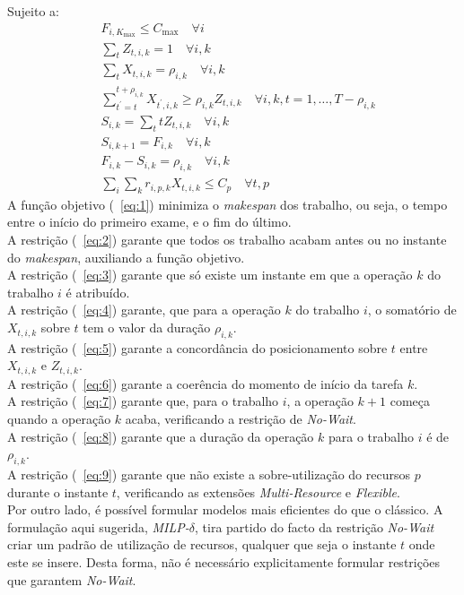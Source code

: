 Sujeito a:
\begin{align}
&F_{i,K_{\max}} \leq C_{\max} \quad \forall i \label{eq:2} \\
&\sum_{t}Z_{t,i,k} = 1 \quad \forall i,k \label{eq:3} \\
&\sum_{t}X_{t,i,k} = \rho_{i,k} \quad \forall i,k \label{eq:4} \\
&\sum^{t+\rho_{i,k}}_{t^{'}=t}X_{t^{'},i,k} \geq \rho_{i,k}Z_{t,i,k} \quad \forall i,k,t=1, \ldots,T-\rho_{i,k} \label{eq:5} \\
&S_{i,k} = \sum_{t}tZ_{t,i,k} \quad \forall i,k \label{eq:6} \\
&S_{i,k+1} = F_{i,k} \quad \forall i,k \label{eq:7} \\
&F_{i,k} - S_{i,k} = \rho_{i,k} \quad \forall i,k \label{eq:8} \\
&\sum_{i}\sum_{k}r_{i,p,k}X_{t,i,k} \leq C_{p} \quad \forall t,p \label{eq:9} 
\end{align}
A função objetivo (~\ref{eq:1}) minimiza o \textit{makespan} dos trabalho, ou seja, o tempo entre o início do primeiro exame, e o fim do último.\\
A restrição (~\ref{eq:2}) garante que todos os trabalho acabam antes ou no instante do \textit{makespan}, auxiliando a função objetivo.\\
A restrição (~\ref{eq:3}) garante que só existe um instante em que a operação $k$ do trabalho $i$ é atribuído.\\
A restrição (~\ref{eq:4}) garante, que para a operação $k$ do trabalho $i$, o somatório de $X_{t,i,k}$ sobre $t$ tem o valor da duração $\rho_{i,k}$. \\
A restrição (~\ref{eq:5}) garante a concordância do posicionamento sobre $t$ entre $X_{t,i,k}$ e $Z_{t,i,k}$. \\
A restrição (~\ref{eq:6}) garante a coerência do momento de início da tarefa $k$.\\
A restrição (~\ref{eq:7}) garante que, para o trabalho $i$, a operação $k+1$ começa quando a operação $k$ acaba, verificando a restrição de \textit{No-Wait}. \\
A restrição (~\ref{eq:8}) garante que a duração da operação $k$ para o trabalho $i$ é de $\rho_{i,k}$.\\
A restrição (~\ref{eq:9}) garante que não existe a sobre-utilização do recursos $p$ durante o instante $t$, verificando as extensões \textit{Multi-Resource} e \textit{Flexible}.\\

Por outro lado, é possível formular modelos mais eficientes do que o clássico. A formulação aqui sugerida, \textit{MILP-$\delta$}, tira partido do facto da restrição \textit{No-Wait} criar um padrão de utilização de recursos, qualquer que seja o instante $t$ onde este se insere. Desta forma, não é necessário explicitamente formular restrições que garantem \textit{No-Wait}.\\

